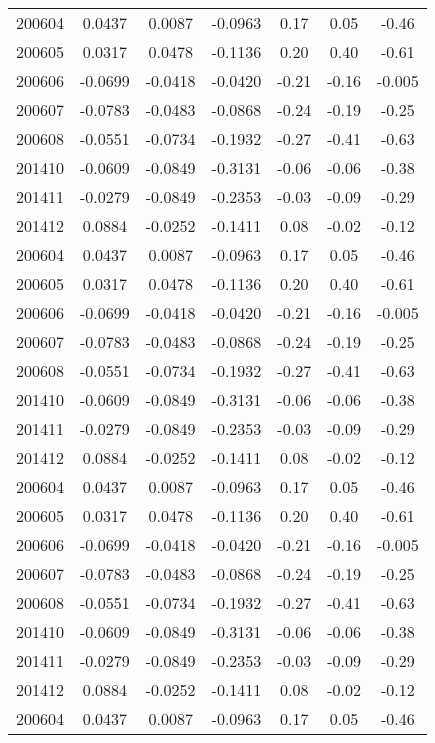 \begin{longtable}[htbp]{|c|| c|| c|| c|| c|| c|| c|}
  200604 & 0.0437 & 0.0087 & -0.0963 & 0.17 & 0.05 & -0.46 \\
  200605 & 0.0317 & 0.0478 & -0.1136 & 0.20 & 0.40 & -0.61 \\
  200606 & -0.0699 & -0.0418 & -0.0420 & -0.21 & -0.16 & -0.005 \\
  200607 & -0.0783 & -0.0483 & -0.0868 & -0.24 & -0.19 & -0.25 \\
  200608 & -0.0551 & -0.0734 & -0.1932 & -0.27 & -0.41 & -0.63 \\
  201410 & -0.0609 & -0.0849 & -0.3131 & -0.06 & -0.06 & -0.38 \\
  201411 & -0.0279 & -0.0849 & -0.2353 & -0.03 & -0.09 & -0.29 \\
  201412 & 0.0884 & -0.0252 & -0.1411 & 0.08 & -0.02 & -0.12 \\ 
  200604 & 0.0437 & 0.0087 & -0.0963 & 0.17 & 0.05 & -0.46 \\
  200605 & 0.0317 & 0.0478 & -0.1136 & 0.20 & 0.40 & -0.61 \\
  200606 & -0.0699 & -0.0418 & -0.0420 & -0.21 & -0.16 & -0.005 \\
  200607 & -0.0783 & -0.0483 & -0.0868 & -0.24 & -0.19 & -0.25 \\
  200608 & -0.0551 & -0.0734 & -0.1932 & -0.27 & -0.41 & -0.63 \\
  201410 & -0.0609 & -0.0849 & -0.3131 & -0.06 & -0.06 & -0.38 \\
  201411 & -0.0279 & -0.0849 & -0.2353 & -0.03 & -0.09 & -0.29 \\
  201412 & 0.0884 & -0.0252 & -0.1411 & 0.08 & -0.02 & -0.12 \\ 
  200604 & 0.0437 & 0.0087 & -0.0963 & 0.17 & 0.05 & -0.46 \\
  200605 & 0.0317 & 0.0478 & -0.1136 & 0.20 & 0.40 & -0.61 \\
  200606 & -0.0699 & -0.0418 & -0.0420 & -0.21 & -0.16 & -0.005 \\
  200607 & -0.0783 & -0.0483 & -0.0868 & -0.24 & -0.19 & -0.25 \\
  200608 & -0.0551 & -0.0734 & -0.1932 & -0.27 & -0.41 & -0.63 \\
  201410 & -0.0609 & -0.0849 & -0.3131 & -0.06 & -0.06 & -0.38 \\
  201411 & -0.0279 & -0.0849 & -0.2353 & -0.03 & -0.09 & -0.29 \\
  201412 & 0.0884 & -0.0252 & -0.1411 & 0.08 & -0.02 & -0.12 \\ 
  200604 & 0.0437 & 0.0087 & -0.0963 & 0.17 & 0.05 & -0.46 \\

\end{longtable}
